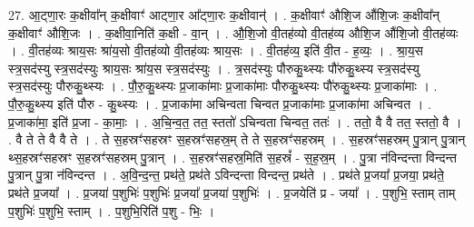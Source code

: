 \documentclass[17pt]{extarticle}
\begin{document}
27. आ॒ट्णा॒रः क॒क्षीवा᳚न् क॒क्षीवाꣳ॑ आट्णा॒र आ᳚ट्णा॒रः क॒क्षीवान्॑ । . क॒क्षीवाꣳ॑ औशि॒ज औ॑शि॒जः क॒क्षीवा᳚न् क॒क्षीवाꣳ॑ औशि॒जः । . क॒क्षीवा॒निति॑ क॒क्षी - वा॒न् । . औ॒शि॒जो वी॒तह॑व्यो वी॒तह॑व्य औशि॒ज औ॑शि॒जो वी॒तह॑व्यः । . वी॒तह॑व्यः श्राय॒सः श्रा॑य॒सो वी॒तह॑व्यो वी॒तह॑व्यः श्राय॒सः । . वी॒तह॑व्य॒ इति॑ वी॒त - ह॒व्यः॒ । . श्रा॒य॒स स्त्र॒सद॑स्यु स्त्र॒सद॑स्युः श्राय॒सः श्रा॑य॒स स्त्र॒सद॑स्युः । . त्र॒सद॑स्युः पौरुकु॒थ्स्यः पौ॑रुकु॒थ्स्य स्त्र॒सद॑स्यु स्त्र॒सद॑स्युः पौरुकु॒थ्स्यः । . पौ॒रु॒कु॒थ्स्यः प्र॒जाका॑माः प्र॒जाका॑माः पौरुकु॒थ्स्यः पौ॑रुकु॒थ्स्यः प्र॒जाका॑माः । . पौ॒रु॒कु॒थ्स्य इति॑ पौरु - कु॒थ्स्यः । . प्र॒जाका॑मा अचिन्वता चिन्वत प्र॒जाका॑माः प्र॒जाका॑मा अचिन्वत । . प्र॒जाका॑मा॒ इति॑ प्र॒जा - का॒माः॒ । . अ॒चि॒न्व॒त॒ तत॒ स्ततो॑ ऽचिन्वता चिन्वत॒ ततः॑ । . ततो॒ वै वै तत॒ स्ततो॒ वै । . वै ते ते वै वै ते । . ते स॒हस्रꣳ॑सहस्रꣳ स॒हस्रꣳ॑सहस्र॒म् ते ते स॒हस्रꣳ॑सहस्रम् । . स॒हस्रꣳ॑सहस्रम् पु॒त्रान् पु॒त्रान् थ्स॒हस्रꣳ॑सहस्रꣳ स॒हस्रꣳ॑सहस्रम् पु॒त्रान् । . स॒हस्रꣳ॑सहस्र॒मिति॑ स॒हस्रं᳚ - स॒ह॒स्र॒म् । . पु॒त्रा न॑विन्दन्ता विन्दन्त पु॒त्रान् पु॒त्रा न॑विन्दन्त । . अ॒वि॒न्द॒न्त॒ प्रथ॑ते॒ प्रथ॑ते ऽविन्दन्ता विन्दन्त॒ प्रथ॑ते । . प्रथ॑ते प्र॒जया᳚ प्र॒जया॒ प्रथ॑ते॒ प्रथ॑ते प्र॒जया᳚ । . प्र॒जया॑ प॒शुभिः॑ प॒शुभिः॑ प्र॒जया᳚ प्र॒जया॑ प॒शुभिः॑ । . प्र॒जयेति॑ प्र - जया᳚ । . प॒शुभि॒ स्ताम् ताम् प॒शुभिः॑ प॒शुभि॒ स्ताम् । . प॒शुभि॒रिति॑ प॒शु - भिः॒ । \newline
\end{document}
